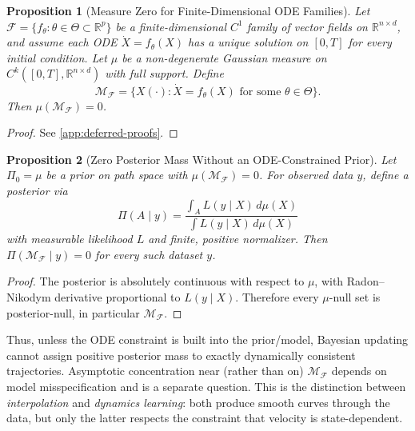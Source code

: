 \documentclass{article}
\newcommand{\RR}{\mathbb{R}}
\theoremstyle{plain}
\newtheorem{proposition}{Proposition}
\theoremstyle{definition}
\theoremstyle{remark}
\begin{document}
\begin{proposition}[Measure Zero for Finite-Dimensional ODE Families]\label{prop:measure-zero}
Let $\mathcal{F} = \{f_\theta : \theta \in \Theta \subset \RR^p\}$ be a finite-dimensional $C^1$ family of vector fields on $\RR^{n \times d}$, and assume each ODE $\dot{X} = f_\theta(X)$ has a unique solution on $[0,T]$ for every initial condition.
Let $\mu$ be a non-degenerate Gaussian measure on $C^k([0,T], \RR^{n \times d})$ with full support.
Define
\begin{equation}
\mathcal{M}_\mathcal{F} = \{X(\cdot) : \dot{X} = f_\theta(X) \text{ for some } \theta \in \Theta\}.
\end{equation}
Then $\mu(\mathcal{M}_\mathcal{F}) = 0$.
\end{proposition}

\begin{proof}
See \cref{app:deferred-proofs}.
\end{proof}

\begin{proposition}[Zero Posterior Mass Without an ODE-Constrained Prior]
Let $\Pi_0 = \mu$ be a prior on path space with $\mu(\mathcal{M}_\mathcal{F}) = 0$.
For observed data $y$, define a posterior via
\begin{equation}
\Pi(A \mid y) = \frac{\int_A L(y \mid X) \, d\mu(X)}{\int L(y \mid X) \, d\mu(X)}
\end{equation}
with measurable likelihood $L$ and finite, positive normalizer.
Then $\Pi(\mathcal{M}_\mathcal{F} \mid y) = 0$ for every such dataset $y$.
\end{proposition}

\begin{proof}
The posterior is absolutely continuous with respect to $\mu$, with Radon--Nikodym derivative proportional to $L(y \mid X)$.
Therefore every $\mu$-null set is posterior-null, in particular $\mathcal{M}_\mathcal{F}$.
\end{proof}

Thus, unless the ODE constraint is built into the prior/model, Bayesian updating cannot assign positive posterior mass to exactly dynamically consistent trajectories.
Asymptotic concentration near (rather than on) $\mathcal{M}_\mathcal{F}$ depends on model misspecification and is a separate question.
This is the distinction between \emph{interpolation} and \emph{dynamics learning}: both produce smooth curves through the data, but only the latter respects the constraint that velocity is state-dependent.
\end{document}
